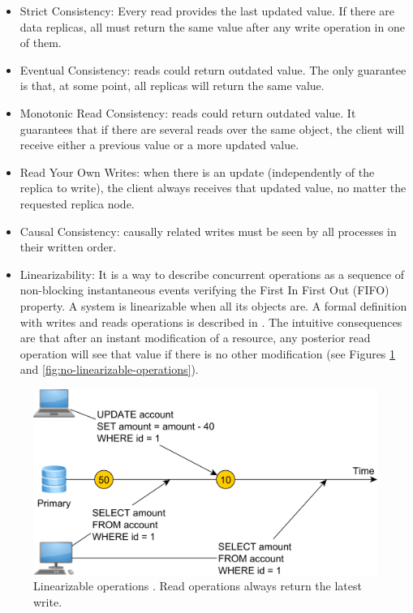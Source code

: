\documentclass[12pt,english]{article} %
\begin{document}
\begin{itemize}
    \item Strict Consistency: Every read provides the last updated value.
    If there are data replicas, all must return the same value after any write operation in one of them.
    \item Eventual Consistency: reads could return outdated value.
    The only guarantee is that, at some point, all replicas will return the same value.
    \item Monotonic Read Consistency: reads could return outdated value.
    It guarantees that if there are several reads over the same object, the client will receive either a previous value or a more updated value.
    \item Read Your Own Writes: when there is an update (independently of the replica to write), the client always receives that updated value, no matter the requested replica node.
    \item Causal Consistency: causally related writes must be seen by all processes in their written order. %
    \item Linearizability: %
    It is a way to describe concurrent operations as a sequence of non-blocking instantaneous events verifying the First In First Out (FIFO) property.
    A system is linearizable when all its objects are.
    A formal definition with writes and reads operations is described in \cite{linearizability-correctness-condition-for-concurrent-objets}.
    The intuitive consequences are that after an instant modification of a resource, any posterior read operation will see that value if there is no other modification (see Figures \ref{fig:linearizable-operations} and \ref{fig:no-linearizable-operations}).
\end{itemize}

\begin{figure}[H]
    \centering
    \includegraphics[width=0.65\linewidth]{img/db/operation/linearizable-operations.png}
    \caption{Linearizable operations \cite{linearizability-question-stackoverflow}. Read operations always return the latest write.
    \label{fig:linearizable-operations}}
\end{figure}
\end{document}
